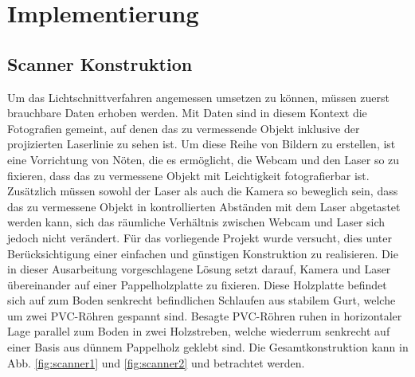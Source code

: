 \chapter{Implementierung}
\label{chap:Implementierung}

\section{Scanner Konstruktion}
\label{sec:scannerKonstruktion}
Um das Lichtschnittverfahren angemessen umsetzen zu können, müssen zuerst brauchbare Daten erhoben werden. Mit Daten sind in diesem Kontext die Fotografien gemeint, auf denen das zu vermessende Objekt inklusive der projizierten Laserlinie zu sehen ist. Um diese Reihe von Bildern zu erstellen, ist eine Vorrichtung von Nöten, die es ermöglicht, die Webcam und den Laser so zu fixieren, dass das zu vermessene Objekt mit Leichtigkeit fotografierbar ist. Zusätzlich müssen sowohl der Laser als auch die Kamera so beweglich sein, dass das zu vermessene Objekt in kontrollierten Abständen mit dem Laser abgetastet werden kann, sich das räumliche Verhältnis zwischen Webcam und Laser sich jedoch nicht verändert. Für das vorliegende Projekt wurde versucht, dies unter Berücksichtigung einer einfachen und günstigen Konstruktion zu realisieren. Die in dieser Ausarbeitung vorgeschlagene Lösung setzt darauf, Kamera und Laser übereinander auf einer Pappelholzplatte zu fixieren. Diese Holzplatte befindet sich auf zum Boden senkrecht befindlichen Schlaufen aus stabilem Gurt, welche um zwei PVC-Röhren gespannt sind. Besagte PVC-Röhren ruhen in horizontaler Lage parallel zum Boden in zwei Holzstreben, welche wiederrum senkrecht auf einer Basis aus dünnem Pappelholz geklebt sind. Die Gesamtkonstruktion kann in Abb. \ref{fig:scanner1} und \ref{fig:scanner2} und betrachtet werden.


